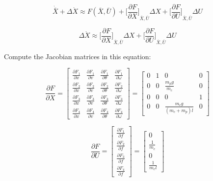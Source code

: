\[
    \dot{\bar{X}} + \Delta \dot{X}
    \approx F(\bar{X}, \bar{U}) + {\Big[ \frac{\partial F}{\partial X} \Big]}_{\bar{X}, \bar{U}} \Delta X + {\Big[ \frac{\partial F}{\partial U} \Big]}_{\bar{X}, \bar{U}} \Delta U
\]

\[
    \Delta \dot{X}
    \approx {\Big[ \frac{\partial F}{\partial X} \Big]}_{\bar{X}, \bar{U}} \Delta X + {\Big[ \frac{\partial F}{\partial U} \Big]}_{\bar{X}, \bar{U}} \Delta U
\]

Compute the Jacobian matrices in this equation:

\[
    \frac{\partial F}{\partial X} =
    \begin{bmatrix}
        \frac{\partial F_1}{\partial x} &
        \frac{\partial F_1}{\partial v} &
        \frac{\partial F_1}{\partial \theta} &
        \frac{\partial F_1}{\partial \omega} \\[0.8em]
        \frac{\partial F_2}{\partial x} &
        \frac{\partial F_2}{\partial v} &
        \frac{\partial F_2}{\partial \theta} &
        \frac{\partial F_2}{\partial \omega} \\[0.8em]
        \frac{\partial F_3}{\partial x} &
        \frac{\partial F_3}{\partial v} &
        \frac{\partial F_3}{\partial \theta} &
        \frac{\partial F_3}{\partial \omega} \\[0.8em]
        \frac{\partial F_4}{\partial x} &
        \frac{\partial F_4}{\partial v} &
        \frac{\partial F_4}{\partial \theta} &
        \frac{\partial F_4}{\partial \omega}
    \end{bmatrix}
    =
    \begin{bmatrix}
        0 & 1 & 0 & 0 \\[0.8em]
        0 & 0 & \frac{m_p g}{m_c} & 0 \\[0.8em]
        0 & 0 & 0 & 1 \\[0.8em]
        0 & 0 & \frac{m_c g}{(m_c + m_p) l} & 0
    \end{bmatrix}
\]

\[
    \frac{\partial F}{\partial U}
    =
    \begin{bmatrix}
        \frac{\partial F_1}{\partial f} \\[0.8em]
        \frac{\partial F_2}{\partial f} \\[0.8em]
        \frac{\partial F_3}{\partial f} \\[0.8em]
        \frac{\partial F_4}{\partial f}
    \end{bmatrix}
    =
    \begin{bmatrix}
        0 \\[0.8em]
        \frac{1}{m_c} \\[0.8em]
        0 \\[0.8em]
        \frac{1}{m_c l}
    \end{bmatrix}
\]

